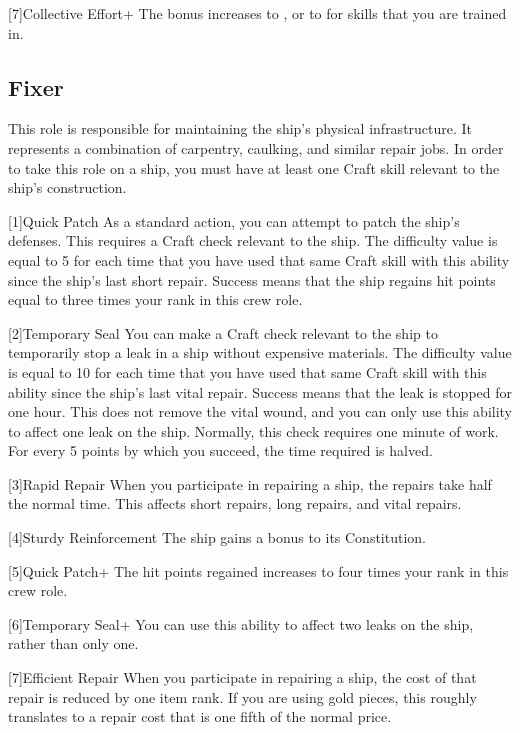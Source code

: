     [7]{Collective Effort+} The bonus increases to , or to  for skills that you are trained in.

  \subsection{Fixer}
    This role is responsible for maintaining the ship's physical infrastructure.
    It represents a combination of carpentry, caulking, and similar repair jobs.
    In order to take this role on a ship, you must have at least one Craft skill relevant to the ship's construction.

    [1]{Quick Patch} As a standard action, you can attempt to patch the ship's defenses.
      This requires a Craft check relevant to the ship.
      The difficulty value is equal to 5  for each time that you have used that same Craft skill with this ability since the ship's last short repair.
      Success means that the ship regains hit points equal to three times your rank in this crew role.

    [2]{Temporary Seal} You can make a Craft check relevant to the ship to temporarily stop a leak in a ship without expensive materials.
      The difficulty value is equal to 10  for each time that you have used that same Craft skill with this ability since the ship's last vital repair.
      Success means that the leak is stopped for one hour.
      This does not remove the vital wound, and you can only use this ability to affect one leak on the ship.
      Normally, this check requires one minute of work.
      For every 5 points by which you succeed, the time required is halved.

    [3]{Rapid Repair} When you participate in repairing a ship, the repairs take half the normal time.
      This affects short repairs, long repairs, and vital repairs.

    [4]{Sturdy Reinforcement} The ship gains a  bonus to its Constitution.

    [5]{Quick Patch+} The hit points regained increases to four times your rank in this crew role.

    [6]{Temporary Seal+} You can use this ability to affect two leaks on the ship, rather than only one.

    [7]{Efficient Repair} When you participate in repairing a ship, the cost of that repair is reduced by one item rank.
      If you are using gold pieces, this roughly translates to a repair cost that is one fifth of the normal price.

